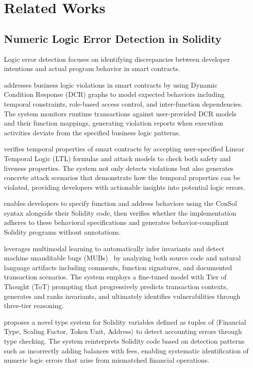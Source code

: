 \documentclass[pdflatex,sn-basic]{sn-jnl}%
\theoremstyle{thmstyleone}%
\theoremstyle{thmstyletwo}%
\theoremstyle{thmstylethree}%
\begin{document}
\section{Related Works}\label{sec:related}
\subsection{Numeric Logic Error Detection in Solidity}
Logic error detection focuses on identifying discrepancies between developer intentions and actual program behavior in smart contracts.

\citep{highguard} addresses business logic violations in smart contracts by using Dynamic Condition Response (DCR) graphs
to model expected behaviors including temporal constraints, role-based access control, and inter-function dependencies.
The system monitors runtime transactions against user-provided DCR models and their function mappings,
generating violation reports when execution activities deviate from the specified business logic patterns.

\citep{smartpulse} verifies temporal properties of smart contracts by accepting user-specified Linear Temporal Logic (LTL) formulas
and attack models to check both safety and liveness properties.
The system not only detects violations but also generates concrete attack scenarios that demonstrate how the temporal properties can be violated,
providing developers with actionable insights into potential logic errors.

\citep{consolidating} enables developers to specify function and address behaviors using the ConSol syntax alongside their Solidity code,
then verifies whether the implementation adheres to these behavioral specifications and generates behavior-compliant Solidity programs without annotations.

\citep{smartinv} leverages multimodal learning to automatically infer invariants and detect machine unauditable bugs (MUBs)~\citep{exploitablebugs}
by analyzing both source code and natural language artifacts including comments, function signatures, and documented transaction scenarios.
The system employs a fine-tuned model with Tier of Thought (ToT) prompting that progressively predicts transaction contexts,
generates and ranks invariants, and ultimately identifies vulnerabilities through three-tier reasoning.

\citep{accountingerrors} proposes a novel type system for Solidity variables defined as tuples of $\langle$Financial Type, Scaling Factor, Token Unit, Address$\rangle$
to detect accounting errors through type checking.
The system reinterprets Solidity code based on detection patterns such as incorrectly adding balances with fees,
enabling systematic identification of numeric logic errors that arise from mismatched financial operations.
\end{document}

